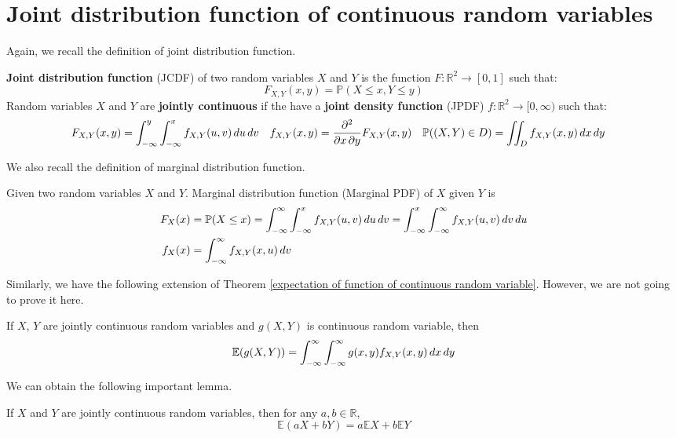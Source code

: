 \documentclass{huhtakm-template-book}
\newcommand{\prob}{\mathbb{P}}
\newcommand{\expect}{\mathbb{E}}
\begin{document}
\section{Joint distribution function of continuous random variables}
    Again, we recall the definition of joint distribution function.
    \begin{defn}
        \textbf{Joint distribution function} (JCDF) of two random variables $X$ and $Y$ is the function $F:\mathbb{R}^{2}\to[0,1]$ such that:
        \begin{equation*}
            F_{X,Y}(x,y)=\prob(X\leq x,Y\leq y)
        \end{equation*}
        Random variables $X$ and $Y$ are \textbf{jointly continuous} if the have a \textbf{joint density function} (JPDF) $f:\mathbb{R}^{2}\to[0,\infty)$ such that:
        \begin{align*}
            F_{X,Y}(x,y)&=\intlu{-\infty}{y}\intlu{-\infty}{x}f_{X,Y}(u,v)\,du\,dv & f_{X,Y}(x,y)&=\pdv*{F_{X,Y}(x,y)}{x,y} & \prob((X,Y)\in D)&=\iint_{D}f_{X,Y}(x,y)\,dx\,dy
        \end{align*}
    \end{defn}
    We also recall the definition of marginal distribution function.
    \begin{defn}
        Given two random variables $X$ and $Y$. Marginal distribution function (Marginal PDF) of $X$ given $Y$ is
        \begin{align*}
            F_{X}(x)&=\prob(X\leq x)=\intinfty\intlu{-\infty}{x}f_{X,Y}(u,v)\,du\,dv=\intlu{-\infty}{x}\intinfty f_{X,Y}(u,v)\,dv\,du\\
            f_{X}(x)&=\intinfty f_{X,Y}(x,u)\,dv
        \end{align*}
    \end{defn}
    Similarly, we have the following extension of Theorem \ref{expectation of function of continuous random variable}. However, we are not going to prove it here.
    \begin{thm}
        If $X$, $Y$ are jointly continuous random variables and $g(X,Y)$ is continuous random variable, then
        \begin{equation*}
            \expect(g(X,Y))=\intinfty\intinfty g(x,y)f_{X,Y}(x,y)\,dx\,dy
        \end{equation*}
    \end{thm}
    We can obtain the following important lemma.
    \begin{lem}
        If $X$ and $Y$ are jointly continuous random variables, then for any $a,b\in\mathbb{R}$,
        \begin{equation*}
            \expect(aX+bY)=a\expect X+b\expect Y
        \end{equation*}
    \end{lem}
\end{document}
